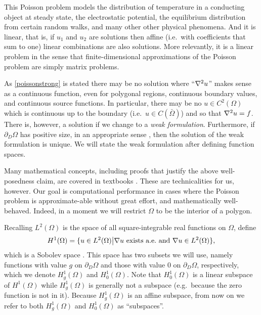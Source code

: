 This Poisson problem models the distribution of temperature in a conducting object at steady state, the electrostatic potential, the equilibrium distribution from certain random walks, and many other other physical phenomena.  And it is linear, that is, if $u_1$ and $u_2$ are solutions then affine (i.e.~with coefficients that sum to one) linear combinations are also solutions.  More relevantly, it is a linear problem in the sense that finite-dimensional approximations of the Poisson problem are simply matrix problems.

As \eqref{poissonstrong} is stated there may be no solution where ``$\nabla^2 u$'' makes sense as a continuous function, even for polygonal regions, continuous boundary values, and continuous source functions.  In particular, there may be no $u\in C^2(\Omega)$ which is continuous up to the boundary (i.e.~$u\in C(\bar\Omega)$) and so that $\nabla^2 u = f$.  There is, however, a solution if we change to a \emph{weak formulation}.  Furthermore, if $\partial_D \Omega$ has positive size, in an appropriate sense \citep[Theorem 1.2.1]{Ciarlet}, then the solution of the weak formulation is unique.  We will state the weak formulation after defining function spaces.

Many mathematical concepts, including proofs that justify the above well-posedness claim, are covered in textbooks \citep{Ciarlet,Evans}.  These are technicalities for us, however.  Our goal is computational performance in cases where the Poisson problem is approximate-able without great effort, and mathematically well-behaved.  Indeed, in a moment we will restrict $\Omega$ to be the interior of a polygon. 

Recalling $L^2(\Omega)$ is the space of all square-integrable real functions on $\Omega$, define
    $$H^1(\Omega) = \{u\in L^2(\Omega) \big| \nabla u \text{ exists a.e.~and } \nabla u \in L^2(\Omega)\},$$
which is a Sobolev space \citep{Evans}.  This space has two subsets we will use, namely functions with value $g$ on $\partial_D \Omega$ and those with value $0$ on $\partial_D \Omega$, respectively, which we denote $H_g^1(\Omega)$ and $H_0^1(\Omega)$.  Note that $H_0^1(\Omega)$ is a linear subspace of $H^1(\Omega)$ while $H_g^1(\Omega)$ is generally not a subspace (e.g.~because the zero function is not in it).  Because $H_g^1(\Omega)$ is an affine subspace, from now on we refer to both $H_g^1(\Omega)$ and $H_0^1(\Omega)$ as ``subspaces''.

